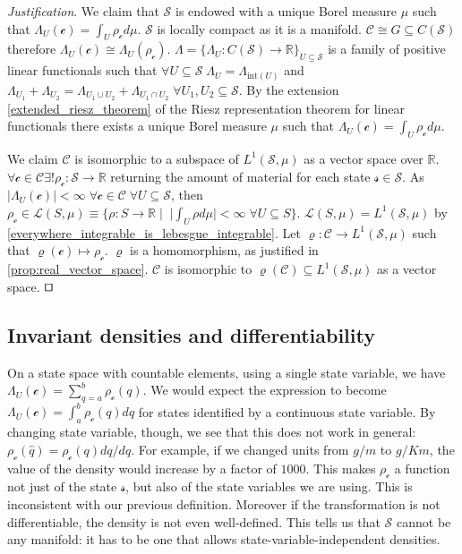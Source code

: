 \documentclass[smallextended]{svjour3}
\numberwithin{equation}{section}
\newenvironment{justification}{\emph{Justification}.}{\hfill\(\qed\)}
\theoremstyle{definition}
\newenvironment{justification}{\emph{Justification}.}{\qed}
\begin{document}
\begin{justification}
	We claim that $\mathcal{S}$ is endowed with a unique Borel measure $\mu$ such that $\Lambda_U (\mathcal{c}) = \int_U \rho_{\mathcal{c}} d \mu$.  $\mathcal{S}$ is locally compact as it is a manifold. $\mathcal{C} \cong G \subseteq C(\mathcal{S})$ therefore $\Lambda_U(\mathcal{c}) \cong \Lambda_U(\rho_\mathcal{c})$. $\Lambda = \{\Lambda_U : C(\mathcal{S}) \rightarrow \mathbb{R}\}_{U \subseteq \mathcal{S}}$ is a family of positive linear functionals such that $\forall U \subseteq \mathcal{S} \; \Lambda_U = \Lambda_{\mathrm{int}(U)}$ and $\Lambda_{U_1} + \Lambda_{U_2} = \Lambda_{U_1 \cup U_2} + \Lambda_{U_1 \cap U_2} \; \forall U_1, U_2 \subseteq \mathcal{S}$. By the extension \ref{extended_riesz_theorem} of the Riesz representation theorem for linear functionals 
	there exists a unique Borel measure $\mu$ such that $\Lambda_U (\mathcal{c}) = \int_{U} \rho_\mathcal{c} d\mu$.

	We claim $\mathcal{C}$ is isomorphic to a subspace of $L^1(\mathcal{S}, \mu)$ as a vector space over $\mathbb{R}$. $\forall \mathcal{c} \in \mathcal{C} \exists ! \rho_{\mathcal{c}}:\mathcal{S} \rightarrow \mathbb{R}$ returning the amount of material for each state $\mathcal{s} \in \mathcal{S}$. As $|\Lambda_{U}(\mathcal{c})| < \infty \; \forall \mathcal{c} \in \mathcal{C} \; \forall U \subseteq \mathcal{S}$, then $\rho_{\mathcal{c}} \in \mathcal{L}(S,\mu) \equiv \{ \rho : S \rightarrow \mathbb{R} \; | \;\; |\int_{U} \rho d\mu| < \infty \; \forall U \subseteq S\}$. $\mathcal{L}(S,\mu) = L^1(\mathcal{S}, \mu)$ by \ref{everywhere_integrable_is_lebesgue_integrable}. Let $\varrho : \mathcal{C} \rightarrow L^1(\mathcal{S}, \mu)$ such that $\varrho(\mathcal{c}) \mapsto \rho_\mathcal{c}$. $\varrho$ is a homomorphism, as justified in \ref{prop:real_vector_space}. $\mathcal{C}$ is isomorphic to $\varrho(\mathcal{C}) \subseteq L^1(\mathcal{S}, \mu)$ as a vector space.
\end{justification}

\subsection{Invariant densities and differentiability}

On a state space with countable elements, using a single state variable, we have $\Lambda_U (\mathcal{c}) = \sum \limits_{q=a}^b \rho_\mathcal{c}(q)$. We would expect the expression to become $\Lambda_U (\mathcal{c}) = \int_a^b \rho_\mathcal{c} (q) dq$ for states identified by a continuous state variable. By changing state variable, though, we see that this does not work in general: $\rho_\mathcal{c}(\hat{q})= \rho_\mathcal{c}(q) dq/d\hat{q}$. For example, if we changed units from $g/m$ to $g/Km$, the value of the density would increase by a factor of $1000$. This makes $\rho_\mathcal{c}$ a function not just of the state $\mathcal{s}$, but also of the state variables we are using. This is inconsistent with our previous definition. Moreover if the transformation is not differentiable, the density is not even well-defined. This tells us that $\mathcal{S}$ cannot be any manifold: it has to be one that allows state-variable-independent densities.
\end{document}
